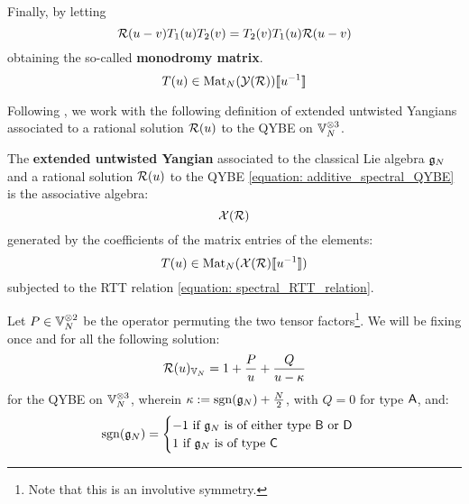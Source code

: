         Finally, by letting 
            \begin{equation} \label{equation: spectral_RTT_relation}
                \mathcal{R}(u - v) T_1(u) T_2(v) = T_2(v) T_1(u) \mathcal{R}(u - v)
            \end{equation}
        obtaining the so-called \textbf{monodromy matrix}.
            $$T(u) \in \operatorname{Mat}_N( \mathcal{Y}(\mathcal{R}) )[\![u^{-1}]\!]$$
    
        Following \cite[Definition 2.1]{guay_regelskis_twisted_yangians_for_symmetric_pairs_of_types_BCD}, we work with the following definition of extended untwisted Yangians associated to a rational solution $\mathcal{R}(u)$ to the QYBE on $\bbV_N^{\tensor 3}$.
        \begin{definition} \label{def: extended_untwisted_yangians}
            The \textbf{extended untwisted Yangian} associated to the classical Lie algebra $\mathfrak{g}_N$ and a rational solution $\mathcal{R}(u)$ to the QYBE \eqref{equation: additive_spectral_QYBE} is the associative algebra:
                $$\mathcal{X}(\mathcal{R})$$
            generated by the coefficients of the matrix entries of the elements:
                $$T(u) \in \operatorname{Mat}_N( \mathcal{X}(\mathcal{R})[\![u^{-1}]\!] )$$
            subjected to the RTT relation \eqref{equation: spectral_RTT_relation}.
        \end{definition}
    
        Let $P \in \bbV_N^{\tensor 2}$ be the operator permuting the two tensor factors\footnote{Note that this is an involutive symmetry.}. We will be fixing once and for all the following solution:
            $$\mathcal{R}(u)_{\mathbb{V}_N} = 1 + \frac{P}{u} + \frac{Q}{u - \kappa}$$
        for the QYBE on $\bbV_N^{\tensor 3}$, wherein $\kappa := \operatorname{sgn}(\mathfrak{g}_N) + \frac{N}{2}$, with $Q = 0$ for type $\mathsf{A}$, and:
            \begin{equation} \label{equation: ABCD_signature}
                \operatorname{sgn}(\mathfrak{g}_N) =
                \begin{cases}
                    \text{$-1$ if $\mathfrak{g}_N$ is of either type $\mathsf{B}$ or $\mathsf{D}$}
                    \\
                    \text{$1$ if $\mathfrak{g}_N$ is of type $\mathsf{C}$}
                \end{cases}
            \end{equation}
    
